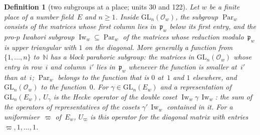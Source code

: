 \documentclass[11pt,a4paper]{article}
\newcommand{\kw}[1]{\emph{#1}}
\newcommand{\m}[1]{\mbox{$#1$}}        %
\theoremstyle{plainx}
\theoremstyle{uprightx}
\newtheorem{definition}[theorem]{Definition}
\newcommand{\NN}{\mathbb{N}}
\newcommand{\Ew}[1]{E_{#1}}
\newcommand{\Ow}[1]{\mathcal{O}_{#1}}
\newcommand{\pw}[1]{\mathfrak{p}_{#1}}
\newcommand{\GL}{\mathrm{GL}}
\newcommand{\Par}{\operatorname{Par}}
\newcommand{\Iw}{\operatorname{Iw}}
\begin{document}
\begin{definition}[two subgroups at a place; units 30 and 122]\label{d:par}
Let $w$ be a finite place of a number field~$E$ and \m{n\ge1}. Inside \m{\GL_n(\Ow{w})}, the subgroup
\m{\Par_w} consists of the matrices whose first column lies in~$\pw{w}$ below its first entry, and the
\kw{pro-$p$ Iwahori subgroup} \m{\Iw_w\subseteq\Par_w} of the matrices whose reduction modulo~$\pw{w}$ is upper
triangular with $1$ on the diagonal. More generally a function from \m{\{1,\dots,n\}} to~$\NN$ has a \kw{block
parahoric subgroup}: the matrices in \m{\GL_n(\Ow{w})} whose entry in row~$i$ and column~$i'$ lies in~$\pw{w}$
whenever the function is smaller at~$i'$ than at~$i$; \m{\Par_w} belongs to the function that is $0$ at~$1$ and
$1$ elsewhere, and \m{\GL_n(\Ow{w})} to the function~$0$. For \m{\gamma\in\GL_n(\Ew{w})} and a representation
of \m{\GL_n(\Ew{w})}, \m{U_\gamma} is the Hecke operator of the double coset \m{\Iw_w\gamma\,\Iw_w}: the sum of the
operators of representatives of the cosets \m{\gamma'\,\Iw_w} contained in it. For a uniformiser~$\varpi$
of~$\Ew{w}$, \m{U_\varpi} is this operator for the diagonal matrix with entries \m{\varpi,1,\dots,1}.
\end{definition}
\end{document}
